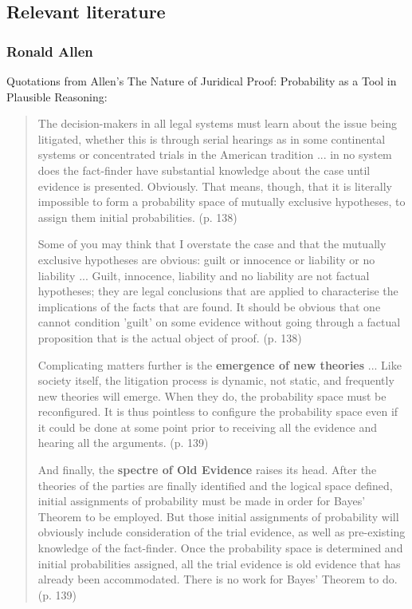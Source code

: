 \documentclass[
  11pt,
  dvipsnames,enabledeprecatedfontcommands]{scrartcl}
\begin{document}
\hypertarget{relevant-literature}{%
\subsection{Relevant literature}\label{relevant-literature}}

\hypertarget{ronald-allen}{%
\subsubsection{Ronald Allen}\label{ronald-allen}}

Quotations from Allen's The Nature of Juridical Proof: Probability as a
Tool in Plausible Reasoning:

\begin{quote}
The decision-makers in all legal systems must learn about the issue being litigated, whether this is through serial hearings as in some continental systems or concentrated trials in the American tradition ... in no system does the fact-finder have substantial knowledge about the case until evidence is presented. Obviously. That means, though, that it is literally impossible to form a probability space of mutually exclusive hypotheses, to assign them initial probabilities. (p. 138)

Some of you may think that I overstate the case and that the mutually exclusive hypotheses are
obvious: guilt or innocence or liability or no liability ... Guilt, innocence, liability and no liability are not factual hypotheses; they are legal conclusions that are applied to characterise the implications of the facts that are found. It should be obvious that one cannot condition 'guilt' on some evidence without going through a factual proposition that is the actual object of proof. (p. 138)

Complicating matters further is the \textbf{emergence of new theories} ... Like society itself, the
litigation process is dynamic, not static, and frequently new theories will emerge. When they do, the
probability space must be reconfigured. It is thus pointless to configure the probability space even if it
could be done at some point prior to receiving all the evidence and hearing all the arguments. (p. 139)

And finally, the \textbf{spectre of Old Evidence} raises its head. After the theories of the parties are finally identified and the logical space defined, initial assignments of probability must be made in order for Bayes' Theorem to be employed. But those initial assignments of probability will obviously include
consideration of the trial evidence, as well as pre-existing knowledge of the fact-finder. Once the
probability space is determined and initial probabilities assigned, all the trial evidence is old evidence
that has already been accommodated. There is no work for Bayes' Theorem to do. (p. 139)


\end{quote}
\end{document}
